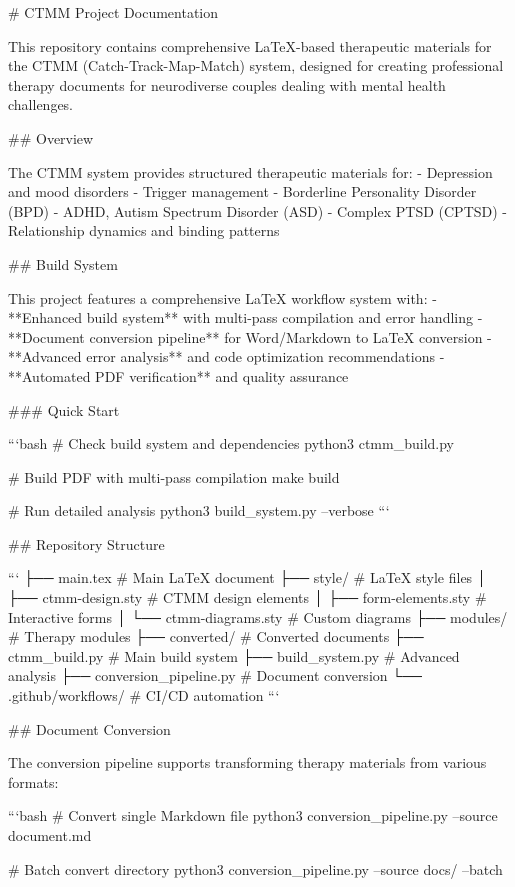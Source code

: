 # CTMM Project Documentation

This repository contains comprehensive LaTeX-based therapeutic materials for the CTMM (Catch-Track-Map-Match) system, designed for creating professional therapy documents for neurodiverse couples dealing with mental health challenges.

## Overview

The CTMM system provides structured therapeutic materials for:
- Depression and mood disorders
- Trigger management
- Borderline Personality Disorder (BPD)
- ADHD, Autism Spectrum Disorder (ASD)
- Complex PTSD (CPTSD)
- Relationship dynamics and binding patterns

## Build System

This project features a comprehensive LaTeX workflow system with:
- **Enhanced build system** with multi-pass compilation and error handling
- **Document conversion pipeline** for Word/Markdown to LaTeX conversion
- **Advanced error analysis** and code optimization recommendations
- **Automated PDF verification** and quality assurance

### Quick Start

```bash
# Check build system and dependencies
python3 ctmm_build.py

# Build PDF with multi-pass compilation
make build

# Run detailed analysis
python3 build_system.py --verbose
```

## Repository Structure

```
├── main.tex                    # Main LaTeX document
├── style/                      # LaTeX style files
│   ├── ctmm-design.sty        # CTMM design elements
│   ├── form-elements.sty      # Interactive forms
│   └── ctmm-diagrams.sty      # Custom diagrams
├── modules/                    # Therapy modules
├── converted/                  # Converted documents
├── ctmm_build.py              # Main build system
├── build_system.py            # Advanced analysis
├── conversion_pipeline.py     # Document conversion
└── .github/workflows/         # CI/CD automation
```

## Document Conversion

The conversion pipeline supports transforming therapy materials from various formats:

```bash
# Convert single Markdown file
python3 conversion_pipeline.py --source document.md

# Batch convert directory
python3 conversion_pipeline.py --source docs/ --batch

